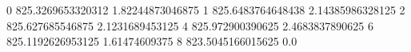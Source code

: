 0 825.3269653320312 1.82244873046875
1 825.6483764648438 2.14385986328125
2 825.627685546875 2.1231689453125
4 825.972900390625 2.4683837890625
6 825.1192626953125 1.61474609375
8 823.5045166015625 0.0
